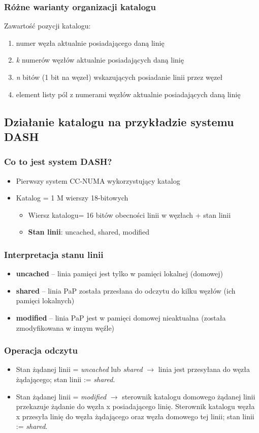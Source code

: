 \documentclass[a4paper,twoside]{article}
\begin{document}
\subsubsection{Różne warianty organizacji katalogu}
Zawartość pozycji katalogu:
\begin{enumerate}
	\item numer węzła aktualnie posiadającego daną linię
	\item \emph{k} numerów węzłów aktualnie posiadających daną linię
	\item \emph{n} bitów (1 bit na węzeł) wskazujących posiadanie linii przez węzeł
	\item element listy pól z numerami węzłów aktualnie posiadających daną linię
\end{enumerate}
\subsection{Działanie katalogu na przykładzie systemu DASH}
\subsubsection{Co to jest system DASH?}
\begin{itemize}
	\item Pierwszy system CC-NUMA wykorzystujący katalog
	\item Katalog = 1 M wierszy 18-bitowych
	\begin{itemize}
		\item Wiersz katalogu= 16 bitów obecności linii w węzłach + stan linii
		\item \textbf{Stan linii}: uncached, shared, modified
	\end{itemize}
\end{itemize}
\subsubsection{Interpretacja stanu linii}
\begin{itemize}
	\item \textbf{uncached} – linia pamięci jest tylko w pamięci lokalnej (domowej)
	\item \textbf{shared} – linia PaP została przesłana do odczytu do kilku węzłów (ich pamięci lokalnych)
	\item \textbf{modified} – linia PaP jest w pamięci domowej nieaktualna (została zmodyfikowana w innym węźle)
\end{itemize}
\subsubsection{Operacja odczytu}
\begin{itemize}
	\item Stan żądanej linii = \textit{uncached} lub \textit{shared} $ \rightarrow $ linia jest przesyłana do węzła żądającego; stan linii := \textit{shared}.
	\item Stan żądanej linii = \textit{modified} $ \rightarrow $ sterownik katalogu domowego żądanej linii przekazuje żądanie do węzła x posiadającego linię. Sterownik katalogu węzła x przesyła linię do węzła żądającego oraz węzła domowego tej linii; stan linii := \textit{shared}.
\end{itemize}
\end{document}
